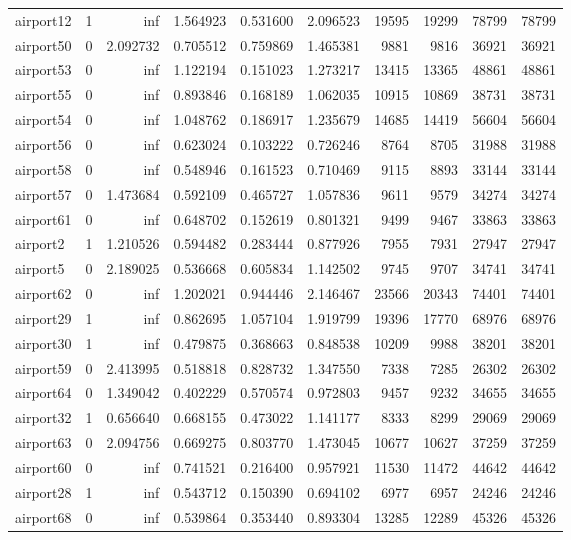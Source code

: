 \begin{longtable}{|l|r|r|r|r|r|r|r|r|r|}
airport12 & 1 & inf & 1.564923 & 0.531600 & 2.096523 & 19595 & 19299 & 78799 & 78799 \\
airport50 & 0 & 2.092732 & 0.705512 & 0.759869 & 1.465381 & 9881 & 9816 & 36921 & 36921 \\
airport53 & 0 & inf & 1.122194 & 0.151023 & 1.273217 & 13415 & 13365 & 48861 & 48861 \\
airport55 & 0 & inf & 0.893846 & 0.168189 & 1.062035 & 10915 & 10869 & 38731 & 38731 \\
airport54 & 0 & inf & 1.048762 & 0.186917 & 1.235679 & 14685 & 14419 & 56604 & 56604 \\
airport56 & 0 & inf & 0.623024 & 0.103222 & 0.726246 & 8764 & 8705 & 31988 & 31988 \\
airport58 & 0 & inf & 0.548946 & 0.161523 & 0.710469 & 9115 & 8893 & 33144 & 33144 \\
airport57 & 0 & 1.473684 & 0.592109 & 0.465727 & 1.057836 & 9611 & 9579 & 34274 & 34274 \\
airport61 & 0 & inf & 0.648702 & 0.152619 & 0.801321 & 9499 & 9467 & 33863 & 33863 \\
airport2 & 1 & 1.210526 & 0.594482 & 0.283444 & 0.877926 & 7955 & 7931 & 27947 & 27947 \\
airport5 & 0 & 2.189025 & 0.536668 & 0.605834 & 1.142502 & 9745 & 9707 & 34741 & 34741 \\
airport62 & 0 & inf & 1.202021 & 0.944446 & 2.146467 & 23566 & 20343 & 74401 & 74401 \\
airport29 & 1 & inf & 0.862695 & 1.057104 & 1.919799 & 19396 & 17770 & 68976 & 68976 \\
airport30 & 1 & inf & 0.479875 & 0.368663 & 0.848538 & 10209 & 9988 & 38201 & 38201 \\
airport59 & 0 & 2.413995 & 0.518818 & 0.828732 & 1.347550 & 7338 & 7285 & 26302 & 26302 \\
airport64 & 0 & 1.349042 & 0.402229 & 0.570574 & 0.972803 & 9457 & 9232 & 34655 & 34655 \\
airport32 & 1 & 0.656640 & 0.668155 & 0.473022 & 1.141177 & 8333 & 8299 & 29069 & 29069 \\
airport63 & 0 & 2.094756 & 0.669275 & 0.803770 & 1.473045 & 10677 & 10627 & 37259 & 37259 \\
airport60 & 0 & inf & 0.741521 & 0.216400 & 0.957921 & 11530 & 11472 & 44642 & 44642 \\
airport28 & 1 & inf & 0.543712 & 0.150390 & 0.694102 & 6977 & 6957 & 24246 & 24246 \\
airport68 & 0 & inf & 0.539864 & 0.353440 & 0.893304 & 13285 & 12289 & 45326 & 45326 \\

\end{longtable}
